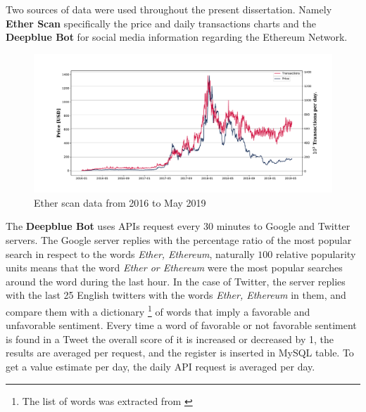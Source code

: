 Two sources of data were used throughout the present dissertation. Namely \textbf{Ether Scan} \cite{ether_scan} specifically the price and daily transactions charts and the \textbf{Deepblue Bot} \cite{deepblueai} for social media information regarding the Ethereum Network. 

\begin{figure}[htpb!] %
	\centering %
	\includegraphics[width=\textwidth]{data/ether_scan_price_trans.pdf} %
	\caption{ Ether scan data from 2016 to May 2019  \cite{ether_scan}} %
	\label{fig:introduction_1} %
\end{figure}

The \textbf{Deepblue Bot} uses APIs request every 30 minutes to Google and Twitter servers. The Google server replies with the percentage ratio of the most popular search in respect to the words \textit{Ether, Ethereum}, naturally $100$ relative popularity units means that the word \textit{Ether or Ethereum} were the most popular searches around the word during the last hour. In the case of Twitter, the server replies with the last 25 English twitters with the words  \textit{Ether, Ethereum} in them, and compare them with a dictionary \footnote{The list of words was extracted from \cite{goshima2015estimating}} of words that imply a favorable and unfavorable sentiment. Every time a word of favorable or not favorable sentiment is found in a Tweet the overall score of it is increased or decreased by 1, the results are averaged per request, and the register is inserted in MySQL table. To get a value estimate per day, the daily API request is averaged per day.

